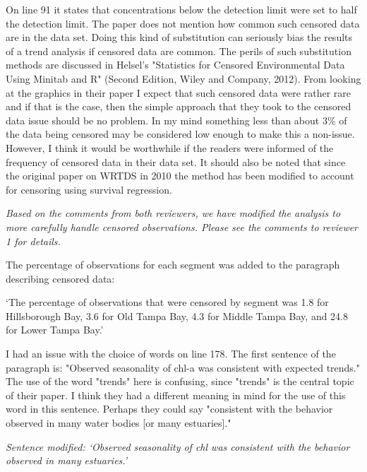\documentclass[letterpaper,12pt,oneside]{article}\usepackage[]{graphicx}\usepackage[]{color}
\begin{document}
On line 91 it states that concentrations below the detection limit were set to half the detection limit.  The paper does not mention how common such censored data are in the data set.  Doing this kind of substitution can seriously bias the results of a trend analysis if censored data are common.  The perils of such substitution methods are discussed in Helsel's "Statistics for Censored Environmental Data Using Minitab and R" (Second Edition, Wiley and Company, 2012).  From looking at the graphics in their paper I expect that such censored data were rather rare and if that is the case, then the simple approach that they took to the censored data issue should be no problem.  In my mind something less than about 3\% of the data being censored may be considered low enough to make this a non-issue.  However, I think it would be worthwhile if the readers were informed of the frequency of censored data in their data set.  It should also be noted that since the original paper on WRTDS in 2010 the method has been modified to account for censoring using survival regression.  

{\it Based on the comments from both reviewers, we have modified the analysis to more carefully handle censored observations.  Please see the comments to reviewer 1 for details.  

The percentage of observations for each segment was added to the paragraph describing censored data:

`The percentage of observations that were censored by segment was 1.8 for Hillsborough Bay, 3.6 for Old Tampa Bay, 4.3 for Middle Tampa Bay, and 24.8 for Lower Tampa Bay.'}

I had an issue with the choice of words on line 178.  The first sentence of the paragraph is: "Observed seasonality of chl-a was consistent with expected trends."  The use of the word "trends" here is confusing, since "trends" is the central topic of their paper.  I think they had a different meaning in mind for the use of this word in this sentence.  Perhaps they could say "consistent with the behavior observed in many water bodies [or many estuaries]."  

{\it Sentence modified: `Observed seasonality of \acs{chl} was consistent with the behavior observed in many estuaries.'}
\end{document}
